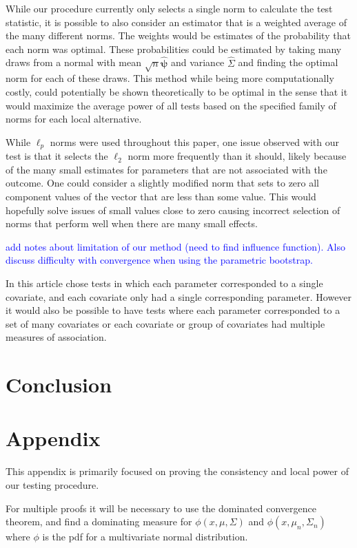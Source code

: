 \documentclass{article}
\begin{document}
While our procedure currently only selects a single norm to calculate the test statistic, it is possible to also consider an estimator that is a weighted average of the many different norms.  The weights would be estimates of the probability that each norm was optimal. These probabilities could be estimated by taking many draws from a normal with mean $\sqrt{n}\hat{\boldsymbol{\psi}}$ and variance $\hat{\Sigma}$ and finding the optimal norm for each of these draws.  This method while being more computationally costly, could potentially be shown theoretically to be optimal in the sense that it would maximize the average power of all tests based on the specified family of norms for each local alternative. 

While $\ell_p$ norms were used throughout this paper, one issue observed with our test is that it selects the $\ell_2$ norm more frequently than it should, likely because of the many small estimates for parameters that are not associated with the outcome.  One could consider a slightly modified norm that sets to zero all component values of the vector that are less than some value.  This would hopefully solve issues of small values close to zero causing incorrect selection of norms that perform well when there are many small effects.

\textcolor{blue}{add notes about limitation of our method (need to find influence function).  Also discuss difficulty with convergence when using the parametric bootstrap.}

In this article chose tests in which each parameter corresponded to a single covariate, and each covariate only had a single corresponding parameter.  However it would also be possible to have tests where each parameter corresponded to a set of many covariates or each covariate or group of covariates had multiple measures of association.

\section{Conclusion}

\section{Appendix}
This appendix is primarily focused on proving the consistency and local power of our testing procedure.  

For multiple proofs it will be necessary to use the dominated convergence theorem, and find a dominating measure for $\phi(x, \mu, \Sigma)$ and $\phi(x, \mu_n, \Sigma_n)$ where $\phi$ is the pdf for a multivariate normal distribution.
\end{document}
